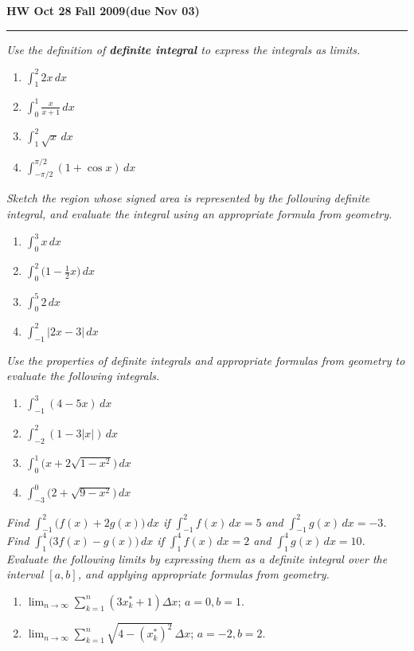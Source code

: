 \documentclass[12pt]{amsart}
\begin{document}
\hfill{\large\bf HW Oct 28}\hfill{\large\bf
  Fall 2009}\hfill{\large\bf (due Nov 03)}\hrule

\bigskip
{\problem \em Use the definition of \textbf{definite integral} to express the integrals as limits.}
\begin{enumerate}
\item $\displaystyle{\int_1^2 2x\, dx}$
\item $\displaystyle{\int_0^1 \frac{x}{x+1}\, dx}$
\item $\displaystyle{\int_1^2 \sqrt{x}\, dx}$
\item $\displaystyle{\int_{-\pi/2}^{\pi/2} (1+\cos x)\, dx}$
\end{enumerate}
{\problem \em Sketch the region whose signed area is represented by the following definite integral, and evaluate the integral using an appropriate formula from geometry.}
\begin{enumerate}
\item $\displaystyle{\int_0^3 x\, dx}$
\item $\displaystyle{\int_0^2 \big( 1 - \tfrac{1}{2}x \big)\, dx}$
\item $\displaystyle{\int_0^5 2\, dx}$
\item $\displaystyle{\int_{-1}^{2} \lvert 2x-3 \rvert\, dx}$
\end{enumerate}
{\problem \em Use the properties of definite integrals and appropriate formulas from geometry to evaluate the following integrals.}
\begin{enumerate}
\item $\displaystyle{\int_{-1}^3 (4-5x)\, dx}$
\item $\displaystyle{\int_{-2}^2 ( 1 - 3\lvert x \rvert)\, dx}$
\item $\displaystyle{\int_0^1 \big( x + 2 \sqrt{1-x^2} \big)\, dx}$
\item $\displaystyle{\int_{-3}^0 \big( 2 + \sqrt{9-x^2} \big)\, dx}$
\end{enumerate}
{\problem \em Find $\displaystyle{\int_{-1}^2 \big( f(x) + 2g(x) \big)\, dx}$ if $\displaystyle{\int_{-1}^2 f(x)\, dx = 5}$ and $\displaystyle{\int_{-1}^2 g(x)\, dx = -3}$.}
{\problem \em Find $\displaystyle{\int_{1}^4 \big( 3f(x) - g(x) \big)\, dx}$ if $\displaystyle{\int_1^4 f(x)\, dx = 2}$ and $\displaystyle{\int_1^4 g(x)\, dx = 10}$.}
{\problem \em Evaluate the following limits by expressing them as a definite integral over the interval $[a,b]$, and applying appropriate formulas from geometry.}
\begin{enumerate}
  \item $\displaystyle{\lim_{n \to \infty} \sum_{k=1}^n (3x_k^\ast +1) \Delta x}$; $a=0, b=1$.
  \item $\displaystyle{\lim_{n \to \infty} \sum_{k=1}^n \sqrt{4-(x_k^\ast)^2}\, \Delta x}$; $a=-2, b=2$.
\end{enumerate}
\end{document}
